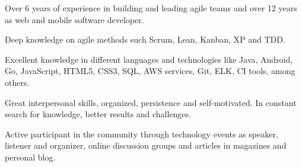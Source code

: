 Over 6 years of experience in building and leading agile teams and over 12 years as web and mobile software developer. 

Deep knowledge on agile methods such Scrum, Lean, Kanban, XP and TDD.

Excellent knowledge in different languages and technologies like Java, Android, Go, JavaScript, HTML5, CSS3, SQL, AWS services, Git, ELK, CI tools, among others. 

Great interpersonal skills, organized, persistence and self-motivated. In constant search for knowledge, better results and challenges. 

Active participant in the community through technology events as speaker, listener and organizer, online discussion groups and articles in magazines and personal blog. 